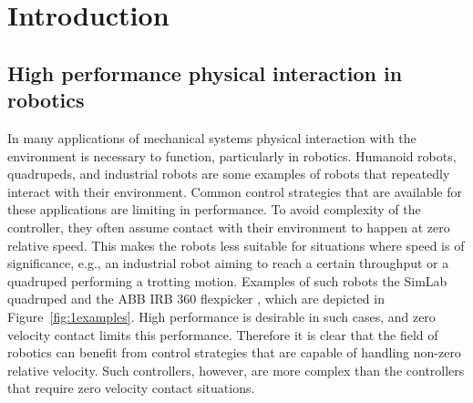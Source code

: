 \documentclass[../DC2017114Bouma.tex]{subfiles}
\begin{document}
\graphicspath{{01_Introduction/img/}}
\renewcommand{\chaptermark}[1]{\markboth{\thechapter.\ #1}{}}
\renewcommand{\sectionmark}[1]{\markright{#1}{}}
\cleartooddpage
\pagestyle{fancyreport}

\chapter{Introduction}
\section{High performance physical interaction in robotics}
In many applications of mechanical systems physical interaction with the environment is necessary to function, particularly in robotics. Humanoid robots, quadrupeds, and industrial robots are some examples of robots that repeatedly interact with their environment. Common control strategies that are available for these applications are limiting in performance. To avoid complexity of the controller, they often assume contact with their environment to happen at zero relative speed. This makes the robots less suitable for situations where speed is of significance, e.g., an industrial robot aiming to reach a certain throughput or a quadruped performing a trotting motion. Examples of such robots the SimLab quadruped \cite{VTquad} and the ABB IRB 360 flexpicker \cite{Flexpicker}, which are depicted in Figure~\ref{fig:1examples}. High performance is desirable in such cases, and zero velocity contact limits this performance. Therefore it is clear that the field of robotics can benefit from control strategies that are capable of handling non-zero relative velocity. Such controllers, however, are more complex than the controllers that require zero velocity contact situations.
\end{document}
